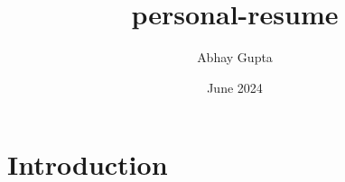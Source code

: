 \documentclass{article}
\title{personal-resume}
\author{Abhay Gupta}
\date{June 2024}
\begin{document}
\maketitle

\section{Introduction}
\end{document}
